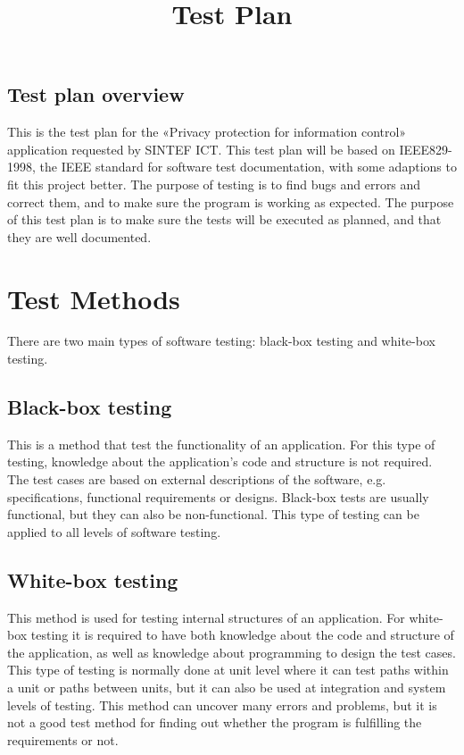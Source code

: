 \documentclass[12pt, fullpage, oneside]{report}
\begin{document}
\title{Test Plan}

	\subsection*{Test plan overview}
		This is the test plan for the «Privacy protection for information control» application requested by SINTEF ICT. This test plan will be based on IEEE829-1998, the IEEE standard for software test documentation, with some adaptions to fit this project better. The purpose of testing is to 		find bugs and errors and correct them, and to make sure the program is working as expected. The purpose of this test plan is to make sure the tests will be executed as planned, and that they are well documented.

	\setcounter{tocdepth}{1}

	\section{Test Methods}
		There are two main types of software testing: black-box testing and white-box testing.
		
		\subsection*{Black-box testing}
			This is a method that test the functionality of an application. For this type of testing, knowledge about the application's code and structure is not required. The test cases are based on external descriptions of the software, e.g. specifications, functional requirements or 					designs. Black-box tests are usually functional, but they can also be non-functional. This type of testing can be applied to all levels of software testing.
		
		\subsection*{White-box testing}
			This method is used for testing internal structures of an application. For white-box testing it is required to have both knowledge about the code and structure of the application, as well as knowledge about programming to design the test cases. This type of testing is normally 				done at unit level where it can test paths within a unit or paths between units, but it can also be used at integration and system levels of testing. This method can uncover many errors and problems, but it is not a good test method for finding out whether the program is 					fulfilling the requirements or not.
\end{document}
